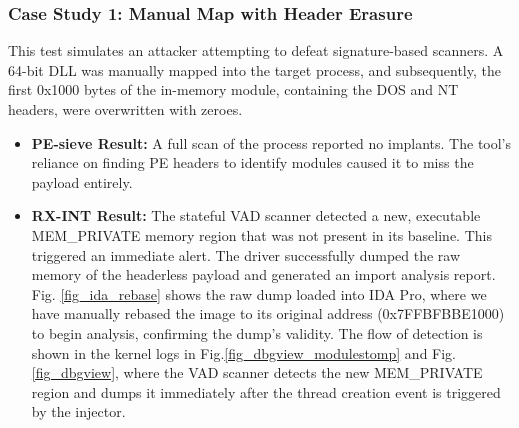 \documentclass[journal]{IEEEtran}
\begin{document}
\subsubsection{Case Study 1: Manual Map with Header Erasure}
This test simulates an attacker attempting to defeat signature-based scanners. A 64-bit DLL was manually mapped into the target process, and subsequently, the first 0x1000 bytes of the in-memory module, containing the DOS and NT headers, were overwritten with zeroes.
\begin{itemize}
\item \textbf{PE-sieve Result:} A full scan of the process reported no implants. The tool's reliance on finding PE headers to identify modules caused it to miss the payload entirely.
\item \textbf{RX-INT Result:} The stateful VAD scanner detected a new, executable MEM\_PRIVATE memory region that was not present in its baseline. This triggered an immediate alert. The driver successfully dumped the raw memory of the headerless payload and generated an import analysis report. Fig. \ref{fig_ida_rebase} shows the raw dump loaded into IDA Pro, where we have manually rebased the image to its original address (0x7FFBFBBE1000) to begin analysis, confirming the dump's validity. The flow of detection is shown in the kernel logs in Fig.\ref{fig_dbgview_modulestomp} and Fig. \ref{fig_dbgview}, where the VAD scanner detects the new MEM\_PRIVATE region and dumps it immediately after the thread creation event is triggered by the injector.
\end{itemize}
\end{document}
